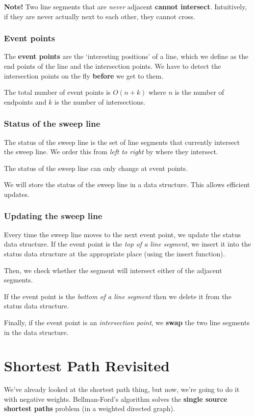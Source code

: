 \documentclass[11pt,a4paper,titlepage,dvipsnames,cmyk]{scrartcl}
\begin{document}
\textbf{Note!} Two line segments that are \textit{never} adjacent
\textbf{cannot intersect}. Intuitively, if they are never actually next to
each other, they cannot cross.

\subsubsection{Event points}%
\label{ssub:event-points}
The \textbf{event points} are the `interesting positions' of a line, which
we define as the end points of the line and the intersection points. We
have to detect the intersection points on the fly \textbf{before} we get
to them.

The total number of event points is $O(n + k)$ where $n$ is the number of
endpoints and $k$ is the number of intersections.

\subsubsection{Status of the sweep line}%
\label{ssub:status-sweep-line}
The status of the sweep line is the set of line segments that currently
intersect the sweep line. We order this from \textit{left to right} by
where they intersect.

The status of the sweep line can only change at event points.

We will store the status of the sweep line in a data structure. This allows
efficient updates.

\subsubsection{Updating the sweep line}%
\label{ssub:update-sweep-line}
Every time the sweep line moves to the next event point, we update the
status data structure. If the event point is the \textit{top of a line
segment}, we insert it into the status data structure at the appropriate
place (using the insert function).

Then, we check whether the segment will intersect either of the adjacent
segments.

If the event point is the \textit{bottom of a line segment} then we delete
it from the status data structure.

Finally, if the event point is an \textit{intersection point}, we
\textbf{swap} the two line segments in the data structure.

\section{Shortest Path Revisited}%
\label{sec:shortest-path-revisited}
We've already looked at the shortest path thing, but now, we're going to
do it with negative weights. Bellman-Ford's algorithm solves the
\textbf{single source shortest paths} problem (in a weighted directed
graph).
\end{document}
